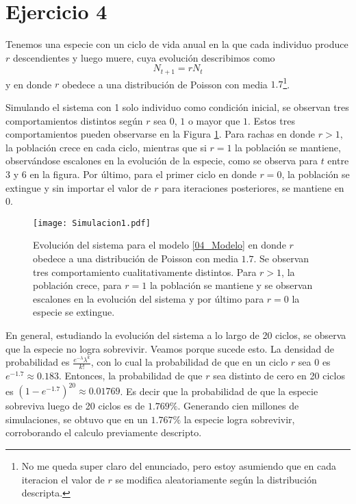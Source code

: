 \section*{Ejercicio 4}
\graphicspath{{Figuras/ej_04/}}

Tenemos una especie con un ciclo de vida anual en la que cada individuo produce $r$ descendientes y luego muere, cuya evolución describimos como
\begin{equation}
    N_{t+1} = r N_{t}
    \label{04_Modelo}
\end{equation}
y en donde $r$ obedece a una distribución de Poisson con media $1.7$\footnote{No me queda super claro del enunciado, pero estoy asumiendo que en cada iteracion el valor de $r$ se modifica aleatoriamente según la distribución descripta.}.

Simulando el sistema con 1 solo individuo como condición inicial, se observan tres comportamientos distintos según $r$ sea $0$, $1$ o mayor que $1$. Estos tres comportamientos pueden observarse en la Figura \ref{04_Simulacion}. Para rachas en donde $r>1$, la población crece en cada ciclo, mientras que si $r=1$ la población se mantiene, observándose escalones en la evolución de la especie, como se observa para $t$ entre 3 y 6 en la figura. Por último, para el primer ciclo en donde $r=0$, la población se extingue y sin importar el valor de $r$ para iteraciones posteriores, se mantiene en $0$. 

\begin{figure}[h!]
    \centering
    \texttt{[image: Simulacion1.pdf]}
    \caption{Evolución del sistema para el modelo \ref{04_Modelo} en donde $r$ obedece a una distribución de Poisson con media $1.7$. Se observan tres comportamiento cualitativamente distintos. Para $r>1$, la población crece, para $r=1$ la población se mantiene y se observan escalones en la evolución del sistema y por último para $r=0$ la especie se extingue.}
    \label{04_Simulacion}
\end{figure}

En general, estudiando la evolución del sistema a lo largo de 20 ciclos, se observa que la especie no logra sobrevivir. Veamos porque sucede esto. La densidad de probabilidad es $\frac{e^{-\lambda}\lambda^{k}}{k!}$, con lo cual la probabilidad de que en un ciclo $r$ sea $0$ es $e^{-1.7}\approx0.183$. Entonces, la probabilidad de que $r$ sea distinto de cero en 20 ciclos es $(1-e^{-1.7})^{20}\approx0.01769$. Es decir que la probabilidad de que la especie sobreviva luego de 20 ciclos es de $1.769\%$. Generando cien millones de simulaciones, se obtuvo que en un $1.767\%$ la especie logra sobrevivir, corroborando el calculo previamente descripto. 
